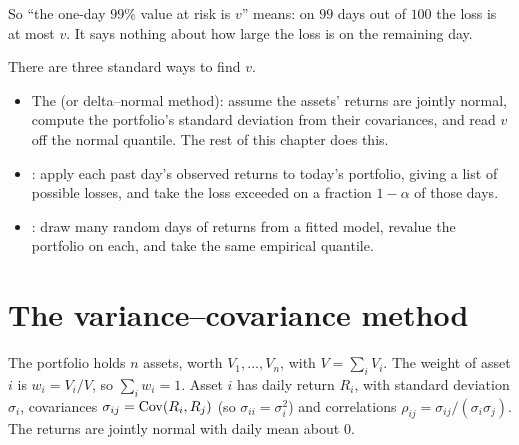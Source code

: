 So ``the one-day $99\%$ value at risk is $v$'' means: on $99$ days out of $100$ the loss is at most $v$. It says nothing about how large the loss is on the remaining day.

\begin{pic}
\end{pic}

There are three standard ways to find $v$.
\begin{itemize}
  \item The  (or delta--normal method): assume the assets' returns are jointly normal, compute the portfolio's standard deviation from their covariances, and read $v$ off the normal quantile. The rest of this chapter does this.
  \item {}: apply each past day's observed returns to today's portfolio, giving a list of possible losses, and take the loss exceeded on a fraction $1-\alpha$ of those days.
  \item {}: draw many random days of returns from a fitted model, revalue the portfolio on each, and take the same empirical quantile.
\end{itemize}

\section{The variance--covariance method}

\begin{setup}
The portfolio holds $n$ assets, worth $V_1,\dots,V_n$, with $V=\sum_iV_i$. The weight of asset $i$ is $w_i=V_i/V$, so $\sum_iw_i=1$. Asset $i$ has daily return $R_i$, with standard deviation $\sigma_i$, covariances $\sigma_{ij}=\operatorname{Cov}(R_i,R_j)$ (so $\sigma_{ii}=\sigma_i^2$) and correlations $\rho_{ij}=\sigma_{ij}/(\sigma_i\sigma_j)$. The returns are jointly normal with daily mean about $0$.
\end{setup}


